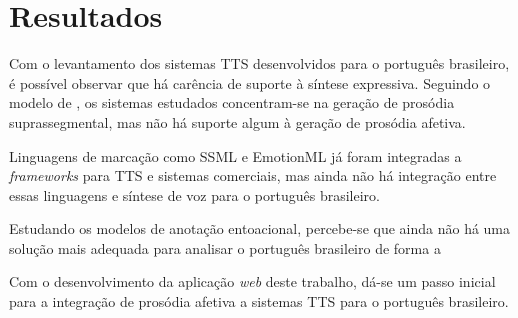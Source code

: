 
\chapter{Resultados}

Com o levantamento dos sistemas TTS desenvolvidos para o português brasileiro, é
possível observar que há carência de suporte à síntese expressiva. Seguindo o modelo de
\cite{taylor2009}, os sistemas estudados concentram-se na geração de prosódia
suprassegmental, mas não há suporte algum à geração de prosódia afetiva.

Linguagens de marcação como SSML e EmotionML já foram integradas a
\emph{frameworks} para TTS e sistemas comerciais, mas ainda não há integração
entre essas linguagens e síntese de voz para o português brasileiro.

Estudando os modelos de anotação entoacional, percebe-se que ainda não há uma
solução mais adequada para analisar o português brasileiro de forma a 

Com o desenvolvimento da aplicação \emph{web} deste trabalho, dá-se um passo
inicial para a integração de prosódia afetiva a sistemas TTS para o português brasileiro.
